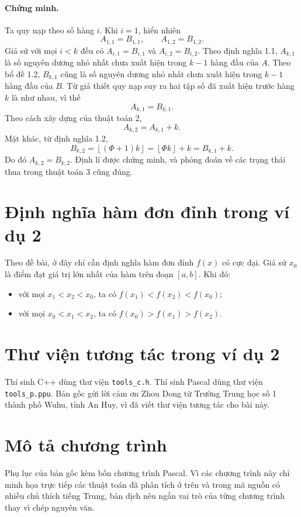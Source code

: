 \documentclass[11pt]{article}
\newcommand{\floor}[1]{\left\lfloor #1\right\rfloor}
\begin{document}
\paragraph{Chứng minh.}
Ta quy nạp theo số hàng \(i\). Khi \(i=1\), hiển nhiên
\[
  A_{1,1}=B_{1,1},\qquad A_{1,2}=B_{1,2}.
\]
Giả sử với mọi \(i<k\) đều có \(A_{i,1}=B_{i,1}\) và \(A_{i,2}=B_{i,2}\).
Theo định nghĩa 1.1, \(A_{k,1}\) là số nguyên dương nhỏ nhất chưa xuất hiện
trong \(k-1\) hàng đầu của \(A\). Theo bổ đề 1.2, \(B_{k,1}\) cũng là số
nguyên dương nhỏ nhất chưa xuất hiện trong \(k-1\) hàng đầu của \(B\). Từ giả
thiết quy nạp suy ra hai tập số đã xuất hiện trước hàng \(k\) là như nhau, vì
thế
\[
  A_{k,1}=B_{k,1}.
\]
Theo cách xây dựng của thuật toán 2,
\[
  A_{k,2}=A_{k,1}+k.
\]
Mặt khác, từ định nghĩa 1.2,
\[
  B_{k,2}
  =
  \floor{(\Phi+1)k}
  =
  \floor{\Phi k}+k
  =
  B_{k,1}+k.
\]
Do đó \(A_{k,2}=B_{k,2}\). Định lí được chứng minh, và phỏng đoán về các
trạng thái thua trong thuật toán 3 cũng đúng.

\section{Định nghĩa hàm đơn đỉnh trong ví dụ 2}

Theo đề bài, ở đây chỉ cần định nghĩa hàm đơn đỉnh \(f(x)\) có cực đại. Giả
sử \(x_0\) là điểm đạt giá trị lớn nhất của hàm trên đoạn \([a,b]\). Khi đó:
\begin{itemize}
  \item với mọi \(x_1<x_2<x_0\), ta có
  \(f(x_1)<f(x_2)<f(x_0)\);
  \item với mọi \(x_0<x_1<x_2\), ta có
  \(f(x_0)>f(x_1)>f(x_2)\).
\end{itemize}

\section{Thư viện tương tác trong ví dụ 2}

Thí sinh C++ dùng thư viện \texttt{tools\_c.h}. Thí sinh Pascal dùng thư viện
\texttt{tools\_p.ppu}. Bản gốc gửi lời cảm ơn Zhou Dong từ Trường Trung học
số 1 thành phố Wuhu, tỉnh An Huy, vì đã viết thư viện tương tác cho bài này.

\section{Mô tả chương trình}

Phụ lục của bản gốc kèm bốn chương trình Pascal. Vì các chương trình này chỉ
minh họa trực tiếp các thuật toán đã phân tích ở trên và trong mã nguồn có
nhiều chú thích tiếng Trung, bản dịch nêu ngắn vai trò của từng chương trình
thay vì chép nguyên văn.
\end{document}
